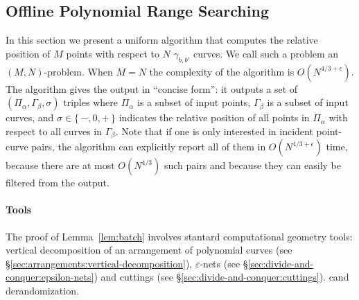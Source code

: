 \subsection{Offline Polynomial Range Searching}%
\label{sec:algo:point-curves-location}

In this section we present a uniform algorithm that computes the relative
position of \(M\) points with respect to \(N\) $\gamma_{b,b'}$ curves. We call
such a problem an \((M,N)\)-problem. When \(M=N\) the complexity of the
algorithm is \(O(N^{4/3+\epsilon})\).
The algorithm gives the output in ``concise form'':
it outputs a set of $(\Pi_\alpha, \Gamma_\beta, \sigma)$ triples where
$\Pi_\alpha$ is a subset of input points, $\Gamma_\beta$ is a subset of input curves, and $\sigma \in
\{\,-,0,+\,\}$ indicates the relative position of all points in $\Pi_\alpha$ with
respect to all curves in $\Gamma_\beta$.
Note that if one is only interested in incident point-curve pairs, the
algorithm can explicitly report all of them in
$O(N^{4/3+\epsilon})$ time, because there are at most $O(N^{4/3})$
such pairs and because they can easily be filtered from the output.

\paragraph{Tools} The proof of Lemma~\ref{lem:batch} involves stantard
computational geometry tools: vertical decomposition of an
arrangement of polynomial curves (see
\S\ref{sec:arrangements:vertical-decomposition}),
$\varepsilon$-nets (see \S\ref{sec:divide-and-conquer:epsilon-nets})
and cuttings (see \S\ref{sec:divide-and-conquer:cuttings}).
cand derandomization.

